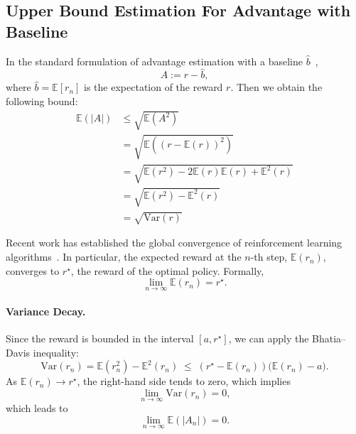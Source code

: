 \documentclass{article} %
\begin{document}
\subsection{Upper Bound Estimation For Advantage with Baseline}
\label{chapter:appendix_proof_baseline}

In the standard formulation of advantage estimation with a baseline $\hat{b}$~\citep{williams1992simple},
\[
A := r - \hat{b},
\]
where $\hat{b} = \mathbb{E}[r_n]$ is the expectation of the reward $r$. Then we obtain the following bound:
\begin{equation}
\begin{aligned}
    \mathbb{E}(|A|)& \le \sqrt{\mathbb{E}(A^2)}\\
            & = \sqrt{\mathbb{E}((r -\mathbb{E}(r))^2)}\\
            & = \sqrt{\mathbb{E}(r^2)-2\mathbb{E}(r)\mathbb{E}(r)+\mathbb{E}^2(r)}\\
            & = \sqrt{\mathbb{E}(r^2)-\mathbb{E}^2(r)} \\
            &= \sqrt{\mathrm{Var}(r)}
\end{aligned}
\end{equation}

Recent work has established the global convergence of reinforcement learning algorithms~\citep{zhang2020global}. In particular, the expected reward at the $n$-th step, $\mathbb{E}(r_n)$, converges to $r^\star$, the reward of the optimal policy. Formally,  
\begin{equation}
    \lim_{n \to \infty} \mathbb{E}(r_n) = r^\star.
\end{equation}

\paragraph{Variance Decay.}  
Since the reward is bounded in the interval $[a, r^\star]$, we can apply the Bhatia–Davis inequality:  
\begin{equation}
    \mathrm{Var}(r_n) 
    = \mathbb{E}(r_n^2) - \mathbb{E}^2(r_n) 
    \;\le\; (r^\star - \mathbb{E}(r_n)) \big(\mathbb{E}(r_n) - a\big).
\end{equation}
As $\mathbb{E}(r_n) \to r^\star$, the right-hand side tends to zero, which implies  
\[\lim_{n \to \infty} \mathrm{Var}(r_n) = 0,\]
which leads to 
\begin{equation}
    \lim_{n \to \infty} \mathbb{E}(|A_n|) = 0.
\end{equation}
\end{document}
